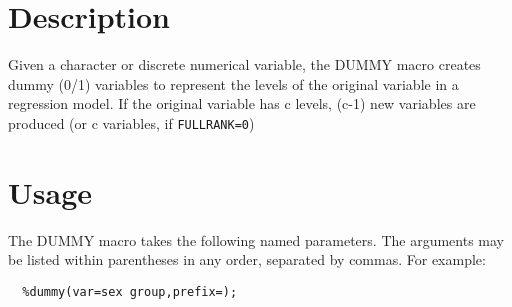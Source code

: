 \section{Description\label{Description}}


Given a character or discrete numerical variable, the DUMMY macro creates
dummy (0/1) variables to represent the levels of the original variable
in a regression model.  If the original variable has c levels, (c-1)
new variables are produced (or c variables, if \texttt{FULLRANK=0})

\section{Usage\label{Usage}}


The DUMMY macro takes the following named parameters.  The arguments
may be listed within parentheses in any order, separated by commas.
For example:

\begin{verbatim}
  %dummy(var=sex group,prefix=);
\end{verbatim}
